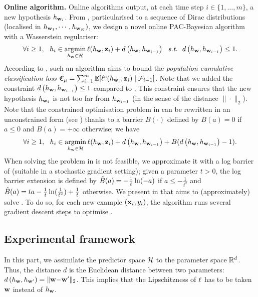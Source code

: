 \documentclass{article}
\begin{document}
\textbf{Online algorithm.} Online algorithms output, at each time step $i \in \{1, \dots, m\}$, a new hypothesis $h_{\mathbf{w}_i}$. 
From , particularised to a sequence of Dirac distributions (localised in $h_{\mathbf{w}_1},\cdots,h_{\mathbf{w}_K})$, we design a novel online PAC-Bayesian algorithm with a Wasserstein regulariser:
\begin{align}
    \label{eq:online-alg-exp}
    \forall i \geq 1,\ \ h_i\in \operatorname*{\mathrm{argmin}}_{h_{\mathbf{w}}\in \mathcal{H}} \ell(h_{\mathbf{w}}, \mathbf{z}_i) +d\left( h_{\mathbf{w}},h_{\mathbf{w}_{i-1}}\right) \ \ \text{{\it s.t.}} \ \ d\left( h_{\mathbf{w}},h_{\mathbf{w}_{i-1}}\right) \le 1.
\end{align}
According to , such an algorithm aims to bound the {\it population cumulative classification loss} $\mathfrak{C}_{\mu} = \sum_{i=1}^{m}\operatorname*{\mathbb{E}}[\ell^{c}(h_{\mathbf{w}_i},\mathbf{z}_i) \mid \mathcal{F}_{i-1}]$.
Note that we added the constraint $d\left( h_{\mathbf{w}},h_{\mathbf{w}_{i-1}}\right) \le 1$ compared to . 
This constraint ensures that the new hypothesis $h_{\mathbf{w}_i}$ is not too far from $h_{\mathbf{w}_{i-1}}$ (in the sense of the distance $\|\cdot\|_2$).
Note that the constrained optimisation problem in  can be rewritten in an unconstrained form (see \cite{boyd2004convex}) thanks to a barrier $B(\cdot)$ defined by $B(a)=0$ if $a\le 0$ and $B(a)=+\infty$ otherwise; we have 
\begin{align}
    \label{eq:online-alg-exp-2}
    \forall i \geq 1,\ \ h_i\in \operatorname*{\mathrm{argmin}}_{h_{\mathbf{w}}\in \mathcal{H}} \ell(h_{\mathbf{w}}, \mathbf{z}_i) + d\left( h_{\mathbf{w}},h_{\mathbf{w}_{i-1}}\right)+ B(d\left( h_{\mathbf{w}},h_{\mathbf{w}_{i-1}}\right)-1).
\end{align}
When solving the problem in  is not feasible, we approximate it with a log barrier of \cite{kervadec2022constrained} (suitable in a stochastic gradient setting); given a parameter $t>0$, the log barrier extension is defined by $\hat{B}(a) = -\frac{1}{t}\ln(-a)$ if $a\le -\frac{1}{t^2}$ and $\hat{B}(a) = ta-\frac{1}{t}\ln(\frac{1}{t^2})+\frac{1}{t}$ otherwise.
We present in   that aims to (approximately) solve .
To do so, for each new example $(\mathbf{x}_i, y_i)$, the algorithm runs several gradient descent steps to optimise .


\subsection{Experimental framework}
\label{sec:exp-fram}

In this part, we assimilate the predictor space $\mathcal{H}$ to the parameter space $\mathbb{R}^d$.
Thus, the distance $d$ is the Euclidean distance between two parameters: $d\left( h_{\mathbf{w}},h_{\mathbf{w}'}\right) = \|\mathbf{w}{-}\mathbf{w}'\|_2$.
This implies that the Lipschitzness of $\ell$ has to be taken \wrt $\mathbf{w}$ instead of $h_{\mathbf{w}}$.
\end{document}
